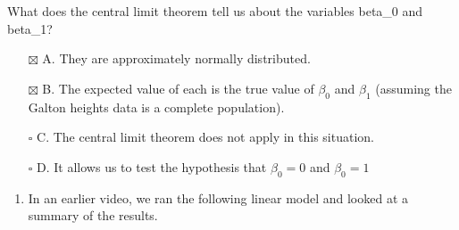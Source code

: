 \documentclass[
]{article}
\newenvironment{Shaded}{\begin{snugshade}}{\end{snugshade}}
\newcommand{\DataTypeTok}[1]{\textcolor[rgb]{0.13,0.29,0.53}{#1}}
\newcommand{\DecValTok}[1]{\textcolor[rgb]{0.00,0.00,0.81}{#1}}
\newcommand{\KeywordTok}[1]{\textcolor[rgb]{0.13,0.29,0.53}{\textbf{#1}}}
\newcommand{\NormalTok}[1]{#1}
\newcommand{\OperatorTok}[1]{\textcolor[rgb]{0.81,0.36,0.00}{\textbf{#1}}}
\newcommand{\OtherTok}[1]{\textcolor[rgb]{0.56,0.35,0.01}{#1}}
\newcommand{\StringTok}[1]{\textcolor[rgb]{0.31,0.60,0.02}{#1}}
\providecommand{\tightlist}{%
  \setlength{\itemsep}{0pt}\setlength{\parskip}{0pt}}
\begin{document}
\begin{Shaded}
\end{Shaded}

What does the central limit theorem tell us about the variables beta\_0
and beta\_1?

\begin{itemize}
\tightlist
\item[$\boxtimes$]
  A. They are approximately normally distributed.
\item[$\boxtimes$]
  B. The expected value of each is the true value of \(\beta_0\) and
  \(\beta_1\) (assuming the Galton heights data is a complete
  population).
\item[$\square$]
  C. The central limit theorem does not apply in this situation.
\item[$\square$]
  D. It allows us to test the hypothesis that \(\beta_0=0\) and
  \(\beta_0=1\)
\end{itemize}

\begin{enumerate}
\def\labelenumi{\arabic{enumi}.}
\setcounter{enumi}{1}
\tightlist
\item
  In an earlier video, we ran the following linear model and looked at a
  summary of the results.
\end{enumerate}
\end{document}
